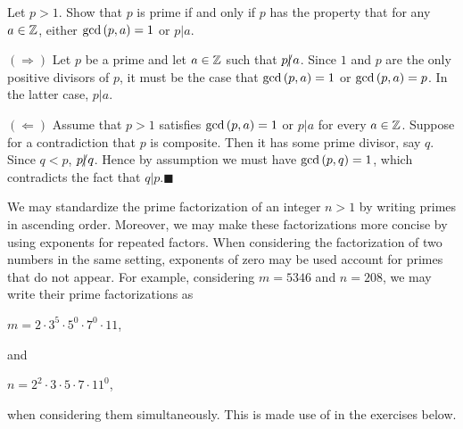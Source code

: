 \documentclass[11pt,fleqn,dvipsnames,usenames]{article}
\newcommand{\p}{\noindent}
\newcommand{\ENDPRF}{\hfill $\blacksquare$}
\begin{document}
\begin{example}
Let $p > 1$.  Show that $p$ is prime if and only if $p$ has the property that for any $a\in\mathbb{Z}$, either $\text{gcd}\left(p,a\right) = 1$ or $p|a$.
\end{example}

\solution
\vsp

\p $(\Rightarrow)$ Let $p$ be a prime and let $a\in\mathbb{Z}$ such that $p|\kern-0.9ex{/} a$.  Since $1$ and $p$ are the only positive divisors of $p$, it must be the case that $\text{gcd}\left(p,a\right) = 1$ or $\text{gcd}\left(p,a\right) = p$.  In the latter case, $p|a$.
\vsp

\p $(\Leftarrow)$ Assume that $p>1$ satisfies $\text{gcd}\left(p,a\right) = 1$ or $p|a$ for every $a\in\mathbb{Z}$.  Suppose for a contradiction that $p$ is composite.  Then it has some prime divisor, say $q$.  Since $q < p$, $p|\kern-0.9ex{/} q$.  Hence by assumption we must have $\text{gcd}\left(p,q\right) = 1$, which contradicts the fact that $q|p$.\ENDPRF
\vsp

\begin{remark}
We may standardize the prime factorization of an integer $n > 1$ by writing primes in ascending order.  Moreover, we may make these factorizations more concise by using exponents for repeated factors.  When considering the factorization of two numbers in the same setting, exponents of zero may be used account for primes that do not appear.  For example, considering $m = 5346$ and $n = 208$, we may write their prime factorizations as
\begin{center}
$m = 2\cdot 3^5\cdot 5^0 \cdot 7^0\cdot 11$,
\end{center}
and
\begin{center}
$n = 2^2\cdot 3\cdot 5\cdot 7\cdot 11^{0}$,
\end{center}
when considering them simultaneously.  This is made use of in the exercises below.
\end{remark}
\end{document}

